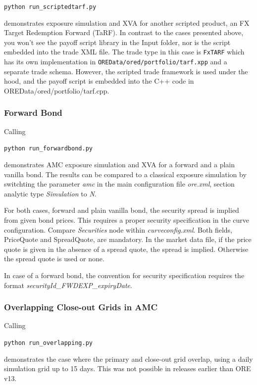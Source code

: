 \medskip
\centerline {\tt python run\_scriptedtarf.py}

\medskip
demonstrates exposure simulation and XVA for another scripted product, an
FX Target Redemption Forward (TaRF). In contrast to the cases presented above, you won't see
the payoff script library in the Input folder, nor is the script embedded into the trade XML file.
The trade type in this case is {\tt FxTARF} which has its own implementation in {\tt OREData/ored/portfolio/tarf.xpp}
and a separate trade schema. However, the scripted trade framework is used under the hood, and the payoff
script is embedded into the C++ code in OREData/ored/portfolio/tarf.cpp.

\subsubsection{Forward Bond}

Calling

\medskip
\centerline {\tt python run\_forwardbond.py}

\medskip
demonstrates AMC exposure simulation and XVA for a forward and a plain vanilla bond.
The results can be compared to a classical exposure simulation by switchting the parameter \emph{amc} in the
main configuration file \emph{ore.xml}, section analytic type \emph{Simulation} to \emph{N}.

For both cases, forward and plain vanilla bond, the security spread is implied from given bond prices.
This requires a proper security specification in the curve configuration. Compare \emph{Securities} node
within \emph{curveconfig.xml}. Both fields, PriceQuote and SpreadQuote, are mandatory. In the market data file,
if the price quote is given in the absence of a spread quote, the spread is implied.
Otherwise the spread quote is used or none.

In case of a forward bond, the convention for security specification requires the format \emph{securityId\_FWDEXP\_expiryDate}.

\subsubsection{Overlapping Close-out Grids in AMC}

Calling

\medskip
\centerline {\tt python run\_overlapping.py}

\medskip
demonstrates the case where the primary and close-out grid overlap, using
a daily simulation grid up to 15 days. This was not possible in releases earlier than ORE v13.

